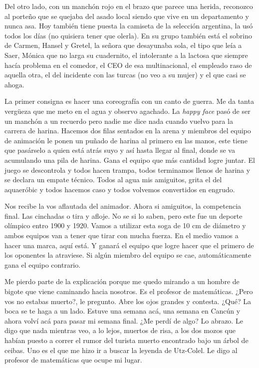 \documentclass[12pt,twoside,openright,a5paper]{book}
\begin{document}
Del otro lado, con un manchón rojo en el brazo que parece una herida,
reconozco al porteño que se quejaba del asado local siendo que vive en
un departamento y nunca asa. Hoy también tiene puesta la camiseta de
la selección argentina, la usó todos los días (no quisiera tener que
olerla). En su grupo también está el sobrino de Carmen, Hansel y Gretel,
la señora que desayunaba sola, el tipo que leía a Saer, Mónica que no
larga su cuadernito, el intolerante a la lactosa que siempre hacía problema
en el comedor, el CEO de esa multinacional, el empleado raso de aquella otra,
el del incidente con las turcas (no veo a su mujer) y el que casi se ahoga.

La primer consigna es hacer una coreografía con un canto de guerra. Me da
tanta vergüeza que me meto en el agua y observo agachado. La \emph{happy face} pasó
de ser un manchón a un recuerdo pero nadie me dice nada cuando vuelvo para
la carrera de harina. Hacemos dos filas sentados en la arena y miembros del
equipo de animación le ponen un puñado de harina al primero en las manos,
este tiene que pasárselo a quien está atrás suyo y así hasta llegar
al final, donde se va acumulando una pila de harina. Gana el equipo que
más cantidad logre juntar. El juego se descontrola y todos hacen trampa,
todos terminamos llenos de harina y se declara un empate técnico. Todos
al agua mis amiguitos, grita el del aquaeróbic y todos hacemos caso y todos
volvemos convertidos en engrudo.

Nos recibe la vos aflautada del animador.
Ahora si amiguitos, la competencia final. Las cinchadas o tira y afloje. No
se si lo saben, pero este fue un deporte olímpico entro 1900 y 1920. Vamos a
utilizar esta soga de 10 cm de diámetro y ambos equipos van a tener que tirar
con mucha fuerza. En el medio vamos a hacer una marca, aquí está. Y ganará
el equipo que logre hacer que el primero de los oponentes la atraviese. Si
algún miembro del equipo se cae, automáticamente gana el equipo contrario.

Me pierdo parte de la explicación porque me quedo mirando a un
hombre de bigote que viene caminando hacia nosotros. Es el profesor de
matemáticas. ¿Pero vos no estabas muerto?, le pregunto. Abre los ojos
grandes y contesta. ¿Qué? La boca se te haga a un lado. Estuve una semana
acá, una semana en Cancún y ahora volví acá para pasar mi semana final. ¿Me
perdí de algo? Lo abrazo. Le digo que nada mientras veo, a lo lejos, muertos de risa,
a los dos mozos que habían puesto a correr el rumor del turista muerto
encontrado bajo un árbol de ceibas. Uno es el que me hizo ir a buscar la
leyenda de Utz-Colel. Le digo al profesor de matemáticas que ocupe mi lugar.
\end{document}
